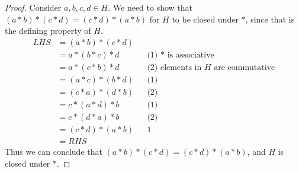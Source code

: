 \documentclass{article}
\begin{document}
\begin{proof}
    Consider $a,b,c,d \in H$. We need to show that $(a*b)*(c*d) = (c*d)*(a*b)$ for $H$ to be closed under $*$, since that is the defining property of $H$.
    \begin{align*}
        LHS & = (a*b)*(c*d) \\
        & = a*(b*c)*d && \text{(1) $*$ is associative} \\
        & = a*(c*b)*d && \text{(2) elements in $H$ are commutative} \\
        & = (a*c)*(b*d) && \text{(1)} \\
        & = (c*a)*(d*b) && \text{(2)} \\
        & = c*(a*d)*b && \text{(1)} \\
        & = c*(d*a)*b && \text{(2)} \\
        & = (c*d)*(a*b) && \text{1} \\
        & = RHS
    \end{align*}
    Thus we can conclude that $(a*b)*(c*d) = (c*d)*(a*b)$, and $H$ is closed under $*$.
\end{proof}
\end{document}

